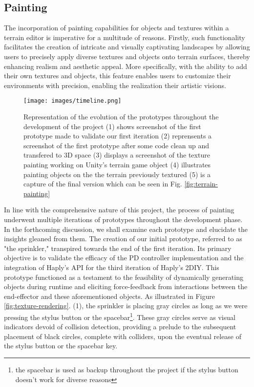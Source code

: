 \subsection{Painting}
The incorporation of painting capabilities for objects and textures within a terrain editor is imperative for a multitude of reasons. 
Firstly, such functionality facilitates the creation of intricate and visually captivating landscapes by allowing users to precisely apply diverse textures and objects onto terrain surfaces, thereby enhancing realism and aesthetic appeal. 
More specifically, with the ability to add their own textures and objects, this feature enables users to customize their environments with precision, enabling the realization their artistic visions. 

\begin{figure}[htbp]
    \centering
    \texttt{[image: images/timeline.png]} 
    \caption{Representation of the evolution of the prototypes throughout the development of the project
    (1) shows screenshot of the first prototype made to validate our first iteration
    (2) reprensents a screenshot of the first prototype after some code clean up and transfered to 3D space
    (3) displays a screenshot of the texture painting working on Unity's terrain game object
    (4) illustrates painting objects on the the terrain previously textured
    (5) is a capture of the final version which can be seen in Fig. \ref{fig:terrain-painting}}
    \label{fig:evolution-painting}
\end{figure}

In line with the comprehensive nature of this project, the process of painting underwent multiple iterations of prototypes throughout the development phase. 
In the forthcoming discussion, we shall examine each prototype and elucidate the insights gleaned from them. 
The creation of our initial prototype, referred to as "the sprinkler," transpired towards the end of the first iteration. 
Its primary objective is to validate the efficacy of the PD controller implementation and the integration of Haply's API for the third iteration of Haply's 2DIY. 
This prototype functioned as a testament to the feasibility of dynamically generating objects during runtime and eliciting force-feedback from interactions between the end-effector and these aforementioned objects.
As illustrated in Figure \ref{fig:texture-rendering}. (1), the sprinkler is placing gray circles as long as we were pressing the stylus button or the spacebar\footnote{the spacebar is used as backup throughout the project if the stylus button doesn't work for diverse reasons}.
These gray circles serve as visual indicators devoid of collision detection, providing a prelude to the subsequent placement of black circles, complete with colliders, upon the eventual release of the stylus button or the spacebar key.


